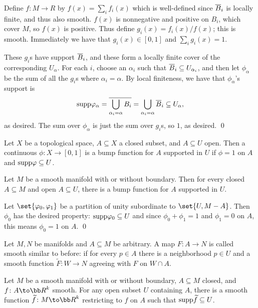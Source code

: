     Define $f\colon M\to R$ by $f(x)=\sum_if_i(x)$ which is well-defined since $\overline B_i$ is locally finite, and thus also smooth.
    $f(x)$ is nonnegative and positive on $B_i$, which cover $M$, so $f(x)$ is positive.
    Thus define $g_i(x)=f_i(x)/f(x)$; this is smooth.
    Immediately we have that $g_i(x)\in[0,1]$ and $\sum_ig_i(x)=1$.

    These $g_i$s have support $\overline B_i$, and these form a locally finite cover of the corresponding $U_\alpha$.
    For each $i$, choose an $\alpha_i$ such that $\overline B_i\subseteq U_{\alpha_i}$, and then let $\phi_\alpha$ be the sum of all the $g_i$s
    where $\alpha_i=\alpha$.
    By local finiteness, we have that $\phi_\alpha$'s support is
    $$ {\rm supp}\varphi_\alpha = \overline{\bigcup_{\alpha_i=\alpha}B_i} = \bigcup_{\alpha_i=\alpha}\overline B_i \subseteq U_\alpha , $$
    as desired.
    The sum over $\phi_\alpha$ is just the sum over $g_i$s, so $1$, as desired.
    \qed

\eproof

\bdefn

    Let $X$ be a topological space, $A\subseteq X$ a closed subset, and $A\subseteq U$ open.
    Then a continuous $\phi\colon X\to[0,1]$ is a {\emphcolor bump function for $A$ supported in $U$} if $\phi=1$ on $A$ and
    ${\rm supp}\varphi\subseteq U$.

\edefn

\bcoro

    Let $M$ be a smooth manifold with or without boundary.
    Then for every closed $A\subseteq M$ and open $A\subseteq U$, there is a bump function for $A$ supported in $U$.

\ecoro

\bproof

    Let $\set{\phi_0,\phi_1}$ be a partition of unity subordinate to $\set{U,M-A}$.
    Then $\phi_0$ has the desired property: ${\rm supp}\varphi_0\subseteq U$ and since $\phi_0+\phi_1=1$ and $\phi_1=0$ on $A$, this means $\phi_0=1$ on $A$.
    \qed

\eproof

Let $M,N$ be manifolds and $A\subseteq M$ be arbitrary.
A map $F\colon A\to N$ is called {\emphcolor smooth} similar to before: if for every $p\in A$ there is a neighborhood $p\in U$ and a smooth
function $\tilde F\colon W\to N$ agreeing with $F$ on $W\cap A$.

\blemm

    Let $M$ be a smooth manifold with or without boundary, $A\subseteq M$ closed, and $f\colon A\to\bR^k$ smooth.
    For any open subset $U$ containing $A$, there is a smooth function $\tilde f\colon M\to\bR^k$ restricting to $f$ on $A$ such that
    ${\rm supp}\widetilde f\subseteq U$.

